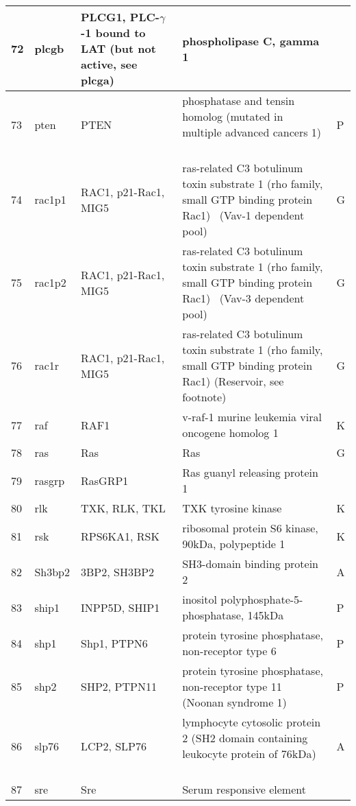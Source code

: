 \documentclass[a4paper, 12pt,epsfig, onecolumn]{article}
\begin{document}
{\begin{longtable}{|p{}|p{}|p{}|p{}|p{}|}
\hline
        72 &    plcgb   & PLCG1, PLC-$\gamma$-1 bound to LAT (but not active, see plcga) & phospholipase C, gamma 1  &            \\
\hline
        73 &      pten  &       PTEN & phosphatase and tensin homolog (mutated in multiple advanced cancers 1)    &         P  \\
\hline
        74 &    rac1p1  & RAC1, p21-Rac1, MIG5 & ras-related C3 botulinum toxin substrate 1 (rho family, small GTP binding protein Rac1)  (Vav-1 dependent pool) &         G  \\
\hline
        75 &    rac1p2  & RAC1, p21-Rac1, MIG5 & ras-related C3 botulinum toxin substrate 1 (rho family, small GTP binding protein Rac1)  (Vav-3 dependent pool) &         G  \\
\hline
        76 &     rac1r  & RAC1, p21-Rac1, MIG5 & ras-related C3 botulinum toxin substrate 1 (rho family, small GTP binding protein Rac1) (Reservoir, see footnote)  &         G  \\
\hline
        77 &     raf    &       RAF1 & v-raf-1 murine leukemia viral oncogene homolog 1  &          K \\
\hline
        78 &     ras    &        Ras &        Ras &         G  \\
\hline
        79 &  rasgrp    &    RasGRP1 & Ras guanyl releasing protein 1 &            \\
\hline
        80 &      rlk   & TXK, RLK, TKL & TXK tyrosine kinase    &          K \\
\hline
        81 &     rsk    & RPS6KA1, RSK & ribosomal protein S6 kinase, 90kDa, polypeptide 1 &          K \\
\hline
        82 &     Sh3bp2 & 3BP2, SH3BP2 & SH3-domain binding protein 2   &         A  \\
\hline
        83 &      ship1 & INPP5D, SHIP1 & inositol polyphosphate-5-phosphatase, 145kDa   &         P  \\
\hline
        84 &     shp1   & Shp1, PTPN6 & protein tyrosine phosphatase, non-receptor type 6    &         P  \\
\hline
        85 &    shp2    & SHP2, PTPN11 & protein tyrosine phosphatase, non-receptor type 11 (Noonan syndrome 1)  &         P  \\
\hline
        86 &      slp76 & LCP2, SLP76 & lymphocyte cytosolic protein 2 (SH2 domain containing leukocyte protein of 76kDa)    &         A  \\
\hline
        87 &      sre   &        Sre & Serum responsive element &            \\

\end{longtable}}
\end{document}
